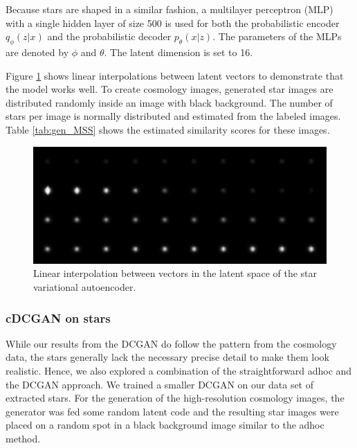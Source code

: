 \documentclass[10pt,conference,compsocconf]{IEEEtran}
\begin{document}
Because stars are shaped in a similar fashion, a multilayer perceptron (MLP) with a single hidden layer of size \SI{500}{} is used for both the probabilistic encoder $q_{\phi}(z|x)$ and the probabilistic decoder $p_{\theta}(x|z)$. The parameters of the MLPs are denoted by $\phi$ and $\theta$. The latent dimension is set to \SI{16}{}. 

Figure \ref{fig:vae_interpolation} shows linear interpolations between latent vectors to demonstrate that the model works well. To create cosmology images, generated star images are distributed randomly inside an image with black background. The number of stars per image is normally distributed and estimated from the labeled images. Table \ref{tab:gen_MSS} shows the estimated similarity scores for these images.


\begin{figure}
    \centering
    \includegraphics[width=\columnwidth]{assets/vae_interpolation_resized.png}
    \caption{Linear interpolation between vectors in the latent space of the star variational autoencoder.}
    \label{fig:vae_interpolation}
\end{figure}

\subsubsection{cDCGAN on stars}

While our results from the DCGAN do follow the pattern from the cosmology data, the stars generally lack the necessary precise detail to make them look realistic. Hence, we also explored a combination of the straightforward adhoc and the DCGAN approach. We trained a smaller DCGAN on our data set of extracted stars. For the generation of the high-resolution cosmology images, the generator was fed some random latent code and the resulting star images were placed on a random spot in a black background image similar to the adhoc method.
\end{document}
